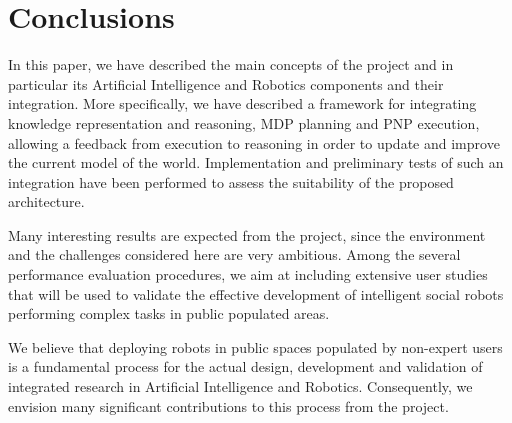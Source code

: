 \section{Conclusions}
\label{sec:conclu}

In this paper, we have described the main concepts of the \coaches project and in particular its Artificial Intelligence and Robotics components and their integration. 
More specifically, we have described a framework for integrating knowledge representation and reasoning, MDP planning and PNP execution, allowing a feedback from execution to reasoning in order to update and improve the current model of the world. 
Implementation and preliminary tests of such an integration have been performed to assess the suitability of the proposed architecture.

Many interesting results are expected from the \coaches project, since the environment and the challenges considered here are very ambitious. 
Among the several performance evaluation procedures, we aim at including extensive user studies that will be used to validate the effective development of intelligent social robots performing complex tasks in public populated areas. 

We believe that deploying robots in public spaces populated by non-expert users is a fundamental process for the actual design, development and validation of integrated research in Artificial Intelligence and Robotics. Consequently, we envision many significant contributions to this process from the \coaches project.





